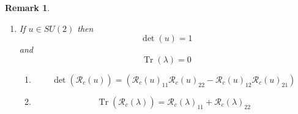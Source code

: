 \documentclass[aps,preprint]{revtex4}%
\newtheorem{remark}[theorem]{Remark}
\begin{document}
\begin{remark}
\begin{enumerate}
\begin{enumerate}
\item are the eigenvalues of $u$
\begin{equation}
\left\{  \xi_{1},\xi_{2}\right\}  =\left\{  e^{i\tau_{1}},e^{i\tau_{2}%
}\right\}
\end{equation}
and

\item are the eigenvalues of $\lambda$
\begin{equation}
\left\{  \tau_{1},\tau_{2}\right\}
\end{equation}
then

\item
\begin{equation}
\det\left(  \overset{}{\mathcal{R}_{c}\left(  u\right)  }\right)  =\det\left(
\overset{}{\exp i\mathcal{R}_{c}\left(  \lambda\right)  }\right)  =%
{\textstyle\prod\limits_{1\leq j\leq2}}
\left(  \xi_{j}\right)  =%
{\textstyle\prod\limits_{1\leq j\leq2}}
\left(  e^{\tau_{j}}\right)  =\exp\left(
{\textstyle\sum\limits_{1\leq j\leq2}}
\tau_{j}\right)  =\exp\left(  i\overset{}{\operatorname*{Tr}\left(
\mathcal{R}_{c}\left(  \lambda\right)  \right)  }\right)  .
\end{equation}

\end{enumerate}

\item If $u\in SU\left(  2\right)  $ then
\begin{equation}
\det\left(  u\right)  =1
\end{equation}
and
\begin{equation}
\operatorname*{Tr}\left(  \lambda\right)  =0
\end{equation}


\begin{enumerate}
\item
\[
\det\left(  \overset{}{\mathcal{R}_{c}\left(  u\right)  }\right)  =\left(
\overset{}{\mathcal{R}_{c}\left(  u\right)  _{11}\mathcal{R}_{c}\left(
u\right)  _{22}-\mathcal{R}_{c}\left(  u\right)  _{12}\mathcal{R}_{c}\left(
u\right)  _{21}}\right)
\]


\item
\begin{equation}
\operatorname*{Tr}\left(  \overset{}{\mathcal{R}_{c}\left(  \lambda\right)
}\right)  =\mathcal{R}_{c}\left(  \lambda\right)  _{11}+\mathcal{R}_{c}\left(
\lambda\right)  _{22}%
\end{equation}



\end{enumerate}
\end{enumerate}
\end{remark}
\end{document}
